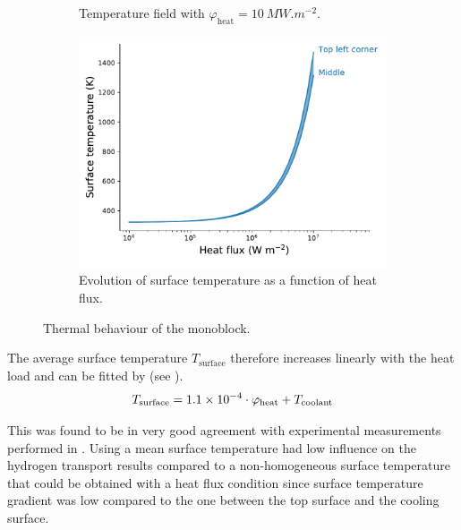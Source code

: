 \begin{figure} [h!]
\begin{subfigure}{0.4\linewidth}
        \caption{Temperature field with $\varphi_\mathrm{heat} = \SI{10}{MW.m^{-2}}$.}
    \end{subfigure}
    \begin{subfigure}{0.7\linewidth}
        \centering
        \includegraphics[width=\linewidth]{Figures/Chapter3/monoblocks/parametric_study/temperature_phi_H.pdf}
        \caption{Evolution of surface temperature as a function of heat flux.}
    \end{subfigure}
    \caption{Thermal behaviour of the monoblock.}
\end{figure}

The average surface temperature $T_\mathrm{surface}$ therefore increases linearly with the heat load and can be fitted by  (see ).
\begin{equation}
    T_\mathrm{surface} = 1.1 \times 10^{-4} \cdot \varphi_\mathrm{heat} + T_\mathrm{coolant}
    \labeq{thermal behaviour law}
\end{equation}

This was found to be in very good agreement with experimental measurements performed in .
Using a mean surface temperature had low influence on the hydrogen transport results compared to a non-homogeneous surface temperature that could be obtained with a heat flux condition since surface temperature gradient was low compared to the one between the top surface and the cooling surface.

